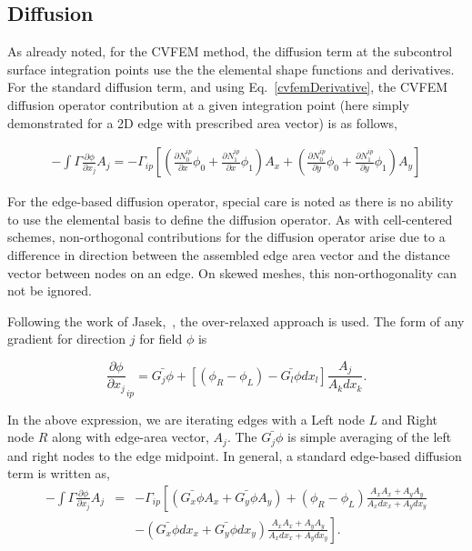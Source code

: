 \subsection{Diffusion}
As already noted, for the CVFEM method, the diffusion term at the 
subcontrol surface integration points use the the elemental
shape functions and derivatives. For the standard diffusion term, 
and using  Eq.~\ref{cvfemDerivative}, the CVFEM diffusion operator
contribution at a given integration point (here simply demonstrated 
for a 2D edge with prescribed area vector) is as follows,

\begin{eqnarray}
  -\int \Gamma \frac{\partial \phi}{\partial x_j} A_j = - \Gamma_{ip} \left[ \left(\frac{\partial N^{ip}_0} {\partial x} \phi_0 + \frac{\partial N^{ip}_1} {\partial x} \phi_1 \right) A_x + \left(\frac{\partial N^{ip}_0} {\partial y} \phi_0 + \frac{\partial N^{ip}_1} {\partial y} \phi_1 \right) A_y \right]
\end{eqnarray}

For the edge-based diffusion operator, special care is noted
as there is no ability to use the elemental basis to define
the diffusion operator. As with cell-centered schemes, non-orthogonal 
contributions for the diffusion operator arise due to a difference in
direction between the assembled edge area vector and the
distance vector between nodes on an edge. On skewed meshes,
this non-orthogonality can not be ignored.

Following the work of Jasek,~\cite{Jasek:1996},
the over-relaxed approach is used. The form of any gradient
for direction $j$ for field $\phi$ is

\begin{equation}
  \frac{\partial \phi}{\partial x_j}_{ip} = \bar{G_j\phi} + \left[ \left(\phi_R - \phi_L \right) 
- \bar{G_l\phi}dx_l \right] \frac{A_j}{A_k dx_k}.
\end{equation}
\label{generalGrad}

In the above expression, we are iterating edges with a Left node $L$ and Right node $R$ along
with edge-area vector, $A_j$. The $\bar{G_j \phi}$ is simple averaging of the left and right nodes
to the edge midpoint. 
In general, a standard edge-based diffusion term is written as,
\begin{eqnarray}
  -\int \Gamma \frac{\partial \phi}{\partial x_j} A_j &=& - \Gamma_{ip} \left[ \left(\bar{G_x \phi}A_x + \bar{G_y \phi}A_y \right)
    + \left( \phi_R -  \phi_L \right) \frac{A_x A_x + A_y A_y}{A_x dx_x + A_y dx_y} \right. \nonumber \\ &&
  - \left. \left( \bar{G_x \phi}dx_x + \bar{G_y \phi}dx_y \right) \frac{A_x A_x + A_y A_y} {A_x dx_x + A_y dx_y} \right].
\end{eqnarray}


